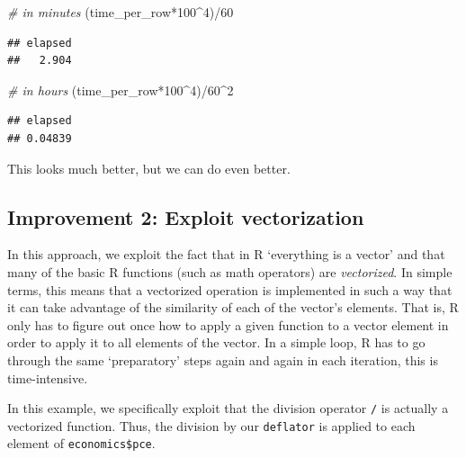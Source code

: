 \documentclass[
  12pt,
]{style/krantz}
\newenvironment{Shaded}{\begin{snugshade}}{\end{snugshade}}
\newcommand{\CommentTok}[1]{\textcolor[rgb]{0.56,0.35,0.01}{\textit{#1}}}
\newcommand{\DecValTok}[1]{\textcolor[rgb]{0.00,0.00,0.81}{#1}}
\newcommand{\NormalTok}[1]{#1}
\newcommand{\SpecialCharTok}[1]{\textcolor[rgb]{0.00,0.00,0.00}{#1}}
\begin{document}
\begin{Shaded}
\begin{Highlighting}[]
\CommentTok{\# in minutes}
\NormalTok{(time\_per\_row}\SpecialCharTok{*}\DecValTok{100}\SpecialCharTok{\^{}}\DecValTok{4}\NormalTok{)}\SpecialCharTok{/}\DecValTok{60} 
\end{Highlighting}
\end{Shaded}

\begin{verbatim}
## elapsed 
##   2.904
\end{verbatim}

\begin{Shaded}
\begin{Highlighting}[]
\CommentTok{\# in hours}
\NormalTok{(time\_per\_row}\SpecialCharTok{*}\DecValTok{100}\SpecialCharTok{\^{}}\DecValTok{4}\NormalTok{)}\SpecialCharTok{/}\DecValTok{60}\SpecialCharTok{\^{}}\DecValTok{2} 
\end{Highlighting}
\end{Shaded}

\begin{verbatim}
## elapsed 
## 0.04839
\end{verbatim}

This looks much better, but we can do even better.

\hypertarget{improvement-2-exploit-vectorization}{%
\subsection{Improvement 2: Exploit vectorization}\label{improvement-2-exploit-vectorization}}

In this approach, we exploit the fact that in R `everything is a vector' and that many of the basic R functions (such as math operators) are \emph{vectorized}. In simple terms, this means that a vectorized operation is implemented in such a way that it can take advantage of the similarity of each of the vector's elements. That is, R only has to figure out once how to apply a given function to a vector element in order to apply it to all elements of the vector. In a simple loop, R has to go through the same `preparatory' steps again and again in each iteration, this is time-intensive.

In this example, we specifically exploit that the division operator \texttt{/} is actually a vectorized function. Thus, the division by our \texttt{deflator} is applied to each element of \texttt{economics\$pce}.
\end{document}

